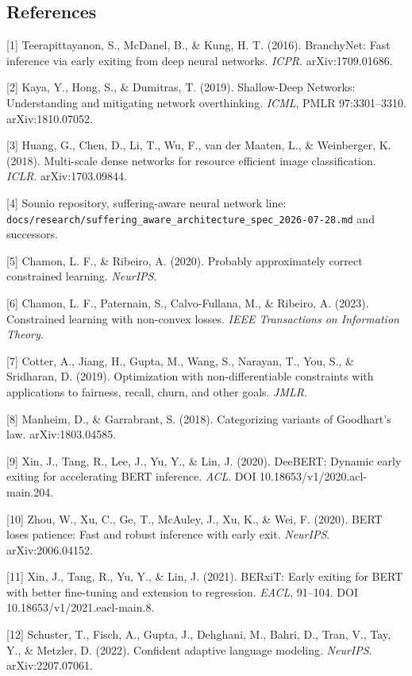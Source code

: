 \documentclass[
]{article}
\begin{document}
\hypertarget{references}{%
\subsection{References}\label{references}}

{[}1{]} Teerapittayanon, S., McDanel, B., \& Kung, H. T. (2016).
BranchyNet: Fast inference via early exiting from deep neural networks.
\emph{ICPR}. arXiv:1709.01686.

{[}2{]} Kaya, Y., Hong, S., \& Dumitras, T. (2019). Shallow-Deep
Networks: Understanding and mitigating network overthinking.
\emph{ICML}, PMLR 97:3301--3310. arXiv:1810.07052.

{[}3{]} Huang, G., Chen, D., Li, T., Wu, F., van der Maaten, L., \&
Weinberger, K. (2018). Multi-scale dense networks for resource efficient
image classification. \emph{ICLR}. arXiv:1703.09844.

{[}4{]} Sounio repository, suffering-aware neural network line:
\texttt{docs/research/suffering\_aware\_architecture\_spec\_2026-07-28.md}
and successors.

{[}5{]} Chamon, L. F., \& Ribeiro, A. (2020). Probably approximately
correct constrained learning. \emph{NeurIPS}.

{[}6{]} Chamon, L. F., Paternain, S., Calvo-Fullana, M., \& Ribeiro, A.
(2023). Constrained learning with non-convex losses. \emph{IEEE
Transactions on Information Theory}.

{[}7{]} Cotter, A., Jiang, H., Gupta, M., Wang, S., Narayan, T., You,
S., \& Sridharan, D. (2019). Optimization with non-differentiable
constraints with applications to fairness, recall, churn, and other
goals. \emph{JMLR}.

{[}8{]} Manheim, D., \& Garrabrant, S. (2018). Categorizing variants of
Goodhart's law. arXiv:1803.04585.

{[}9{]} Xin, J., Tang, R., Lee, J., Yu, Y., \& Lin, J. (2020). DeeBERT:
Dynamic early exiting for accelerating BERT inference. \emph{ACL}. DOI
10.18653/v1/2020.acl-main.204.

{[}10{]} Zhou, W., Xu, C., Ge, T., McAuley, J., Xu, K., \& Wei, F.
(2020). BERT loses patience: Fast and robust inference with early exit.
\emph{NeurIPS}. arXiv:2006.04152.

{[}11{]} Xin, J., Tang, R., Yu, Y., \& Lin, J. (2021). BERxiT: Early
exiting for BERT with better fine-tuning and extension to regression.
\emph{EACL}, 91--104. DOI 10.18653/v1/2021.eacl-main.8.

{[}12{]} Schuster, T., Fisch, A., Gupta, J., Dehghani, M., Bahri, D.,
Tran, V., Tay, Y., \& Metzler, D. (2022). Confident adaptive language
modeling. \emph{NeurIPS}. arXiv:2207.07061.
\end{document}
